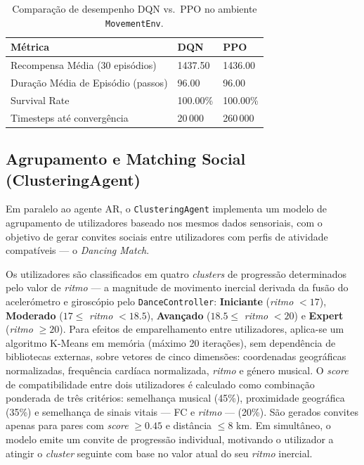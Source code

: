 \documentclass[runningheads]{llncs}
\begin{document}
\begin{table}[t]
\centering
\caption{Comparação de desempenho DQN vs.\ PPO no ambiente \texttt{MovementEnv}.}\label{comparacao_algoritmos}
\begin{tabular}{|l|l|l|}
\hline
\textbf{Métrica} & \textbf{DQN} & \textbf{PPO}\\
\hline
Recompensa Média (30 episódios) & 1437.50 & 1436.00\\
Duração Média de Episódio (passos) & 96.00 & 96.00\\
Survival Rate & 100.00\% & 100.00\%\\
Timesteps até convergência & 20\,000 & 260\,000\\
\hline
\end{tabular}
\end{table}

\subsection{Agrupamento e Matching Social (ClusteringAgent)}
Em paralelo ao agente AR, o \texttt{ClusteringAgent} implementa um modelo de agrupamento de utilizadores baseado nos mesmos dados sensoriais, com o objetivo de gerar convites sociais entre utilizadores com perfis de atividade compatíveis --- o \textit{Dancing Match}.

Os utilizadores são classificados em quatro \textit{clusters} de progressão determinados pelo valor de \textit{ritmo} --- a magnitude de movimento inercial derivada da fusão do acelerómetro e giroscópio pelo \texttt{DanceController}: \textbf{Iniciante} (\textit{ritmo} $< 17$), \textbf{Moderado} ($17 \leq$ \textit{ritmo} $< 18.5$), \textbf{Avançado} ($18.5 \leq$ \textit{ritmo} $< 20$) e \textbf{Expert} (\textit{ritmo} $\geq 20$). Para efeitos de emparelhamento entre utilizadores, aplica-se um algoritmo K-Means em memória (máximo 20 iterações), sem dependência de bibliotecas externas, sobre vetores de cinco dimensões: coordenadas geográficas normalizadas, frequência cardíaca normalizada, \textit{ritmo} e género musical. O \textit{score} de compatibilidade entre dois utilizadores é calculado como combinação ponderada de três critérios: semelhança musical (45\%), proximidade geográfica (35\%) e semelhança de sinais vitais --- FC e \textit{ritmo} --- (20\%). São gerados convites apenas para pares com \textit{score} $\geq 0.45$ e distância $\leq 8$ km. Em simultâneo, o modelo emite um convite de progressão individual, motivando o utilizador a atingir o \textit{cluster} seguinte com base no valor atual do seu \textit{ritmo} inercial.
\end{document}

